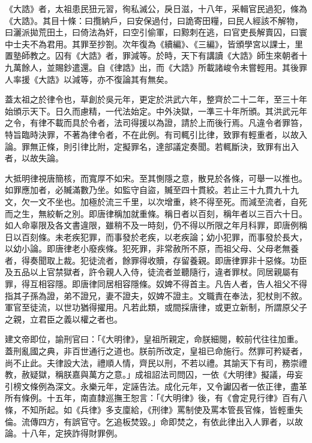 《大誥》者，太祖患民狃元習，徇私滅公，戾日滋，十八年，采輯官民過犯，條為《大誥》。其目十條：曰攬納戶，曰安保過付，曰詭寄田糧，曰民人經該不解物，曰灑派拋荒田土，曰倚法為奸，曰空引偷軍，曰黥刺在逃，曰官吏長解賣囚，曰寰中士夫不為君用。其罪至抄劄。次年復為《續編》、《三編》，皆頒學宮以課士，里置塾師教之。囚有《大誥》者，罪減等。於時，天下有講讀《大誥》師生來朝者十九萬餘人，並賜鈔遣還。自《律誥》出，而《大誥》所載諸峻令未嘗輕用。其後罪人率援《大誥》以減等，亦不復論其有無矣。

蓋太祖之於律令也，草創於吳元年，更定於洪武六年，整齊於二十二年，至三十年始頒示天下。日久而慮精，一代法始定。中外決獄，一準三十年所頒。其洪武元年之令，有律不載而具於令者，法司得援以為證，請於上而後行焉。凡違令者罪笞，特旨臨時決罪，不著為律令者，不在此例。有司輒引比律，致罪有輕重者，以故入論。罪無正條，則引律比附，定擬罪名，達部議定奏聞。若輒斷決，致罪有出入者，以故失論。

大抵明律視唐簡核，而寬厚不如宋。至其惻隱之意，散見於各條，可舉一以推也。如罪應加者，必贓滿數乃坐。如監守自盜，贓至四十貫絞。若止三十九貫九十九文，欠一文不坐也。加極於流三千里，以次增重，終不得至死。而減至流者，自死而之生，無絞斬之別。即唐律稱加就重條。稱日者以百刻，稱年者以三百六十日。如人命辜限及各文書違限，雖稍不及一時刻，仍不得以所限之年月科罪，即唐例稱日以百刻條。未老疾犯罪，而事發於老疾，以老疾論；幼小犯罪，而事發於長大，以幼小論。即唐律老小廢疾條。犯死罪，非常赦所不原，而祖父母、父母老無養者，得奏聞取上裁。犯徒流者，餘罪得收贖，存留養親。即唐律罪非十惡條。功臣及五品以上官禁獄者，許令親人入侍，徒流者並聽隨行，違者罪杖。同居親屬有罪，得互相容隱。即唐律同居相容隱條。奴婢不得首主。凡告人者，告人祖父不得指其子孫為證，弟不證兄，妻不證夫，奴婢不證主。文職責在奉法，犯杖則不敘。軍官至徒流，以世功猶得擢用。凡若此類，或間採唐律，或更立新制，所謂原父子之親，立君臣之義以權之者也。

建文帝即位，諭刑官曰：「《大明律》，皇祖所親定，命朕細閱，較前代往往加重。蓋刑亂國之典，非百世通行之道也。朕前所改定，皇祖已命施行。然罪可矜疑者，尚不止此。夫律設大法，禮順人情，齊民以刑，不若以禮。其諭天下有司，務崇禮教，赦疑獄，稱朕嘉與萬方之意。」成祖詔法司問囚，一依《大明律》擬議，毋妄引榜文條例為深文。永樂元年，定誣告法。成化元年，又令讞囚者一依正律，盡革所有條例。十五年，南直隸巡撫王恕言：「《大明律》後，有《會定見行律》百有八條，不知所起。如《兵律》多支廩給，《刑律》罵制使及罵本管長官條，皆輕重失倫。流傳四方，有誤官守。乞追板焚毀。」命即焚之，有依此律出入人罪者，以故論。十八年，定挾詐得財罪例。


